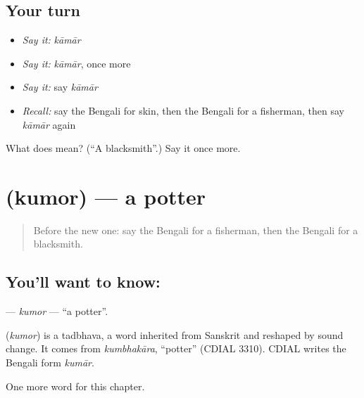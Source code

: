 \subsection*{Your turn}
\begin{itemize}
\raggedright
  \item \emph{Say it:} \emph{kāmār}
  \item \emph{Say it:} \emph{kāmār}, once more
  \item \emph{Say it:} say \emph{kāmār}
  \item \emph{Recall:} say the Bengali for skin, then the Bengali for a fisherman, then say \emph{kāmār} again
\end{itemize}

\begin{tcolorbox}[breakable,colback=teal!4,colframe=teal!35!black,title={Before you move on}]
What does  mean? (\textquotedblleft{}A blacksmith\textquotedblright{}.) Say it once more.
\end{tcolorbox}
\section[\texorpdfstring{\bn{কুমোর} (kumor)}{কুমোর (kumor)}]{ (kumor) — a potter}

\label{lesson:BN-C125-kumor}



\begin{quote}
Before the new one: say the Bengali for a fisherman, then the Bengali for a blacksmith.
\end{quote}

\subsection*{You'll want to know: }
\textbf{} — \emph{kumor} — \textquotedblleft{}a potter\textquotedblright{}.

\begin{cousinweb}
\textbf{} (\emph{kumor}) is a tadbhava, a word inherited from Sanskrit and reshaped by sound change. It comes from \emph{kumbhakāra}, \textquotedblleft{}potter\textquotedblright{} (CDIAL 3310). CDIAL writes the Bengali form \emph{kumār}.
\end{cousinweb}

\begin{grammarlens}[title={What you've built}]
One more word for this chapter.
\end{grammarlens}

